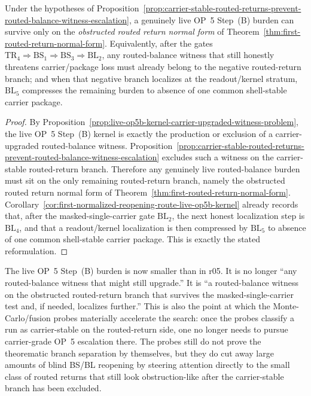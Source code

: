 \begin{corollary}
\label{cor:live-op5b-burden-survives-only-on-obstructed-routed-return-branch}
Under the hypotheses of Proposition~\ref{prop:carrier-stable-routed-returns-prevent-routed-balance-witness-escalation}, a genuinely live OP~5 Step~(B) burden can survive only on the \emph{obstructed routed return normal form} of Theorem~\ref{thm:first-routed-return-normal-form}. Equivalently, after the gates \(\mathrm{TR}_4\Rightarrow\mathrm{BS}_1\Rightarrow\mathrm{BS}_3\Rightarrow\mathrm{BL}_2\), any routed-balance witness that still honestly threatens carrier/package loss must already belong to the negative routed-return branch; and when that negative branch localizes at the readout/kernel stratum, \(\mathrm{BL}_5\) compresses the remaining burden to absence of one common shell-stable carrier package.
\end{corollary}

\begin{proof}
By Proposition~\ref{prop:live-op5b-kernel-carrier-upgraded-witness-problem}, the live OP~5 Step~(B) kernel is exactly the production or exclusion of a carrier-upgraded routed-balance witness. Proposition~\ref{prop:carrier-stable-routed-returns-prevent-routed-balance-witness-escalation} excludes such a witness on the carrier-stable routed-return branch. Therefore any genuinely live routed-balance burden must sit on the only remaining routed-return branch, namely the obstructed routed return normal form of Theorem~\ref{thm:first-routed-return-normal-form}. Corollary~\ref{cor:first-normalized-reopening-route-live-op5b-kernel} already records that, after the masked-single-carrier gate \(\mathrm{BL}_2\), the next honest localization step is \(\mathrm{BL}_4\), and that a readout/kernel localization is then compressed by \(\mathrm{BL}_5\) to absence of one common shell-stable carrier package. This is exactly the stated reformulation.
\end{proof}

\begin{remark}
\label{rem:what-second-op5b-sharpening-buys}
The live OP~5 Step~(B) burden is now smaller than in r05. It is no longer ``any routed-balance witness that might still upgrade.'' It is ``a routed-balance witness on the obstructed routed-return branch that survives the masked-single-carrier test and, if needed, localizes further.'' This is also the point at which the Monte-Carlo/fusion probes materially accelerate the search: once the probes classify a run as carrier-stable on the routed-return side, one no longer needs to pursue carrier-grade OP~5 escalation there. The probes still do not prove the theorematic branch separation by themselves, but they do cut away large amounts of blind BS/BL reopening by steering attention directly to the small class of routed returns that still look obstruction-like after the carrier-stable branch has been excluded.
\end{remark}



